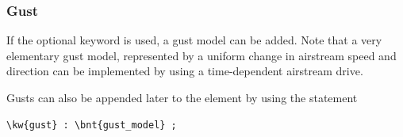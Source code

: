 \subsubsection{Gust}
If the optional  keyword is used, a gust model can be added.
Note that a very elementary gust model, represented by a uniform change
in airstream speed and direction can be implemented by using
a time-dependent airstream drive.

Gusts can also be appended later to the  element
by using the statement
\begin{Verbatim}[commandchars=\\\{\}]
    \kw{gust} : \bnt{gust_model} ;
\end{Verbatim}


